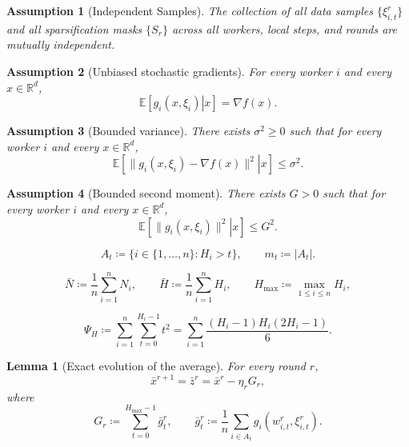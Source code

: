 \documentclass[10pt,a4paper]{amsart}
\newtheorem{assumption}{Assumption}
\newtheorem{lemma}{Lemma}
\newcommand{\ExpCond}[2]{{\mathbb{E}}\left[\left.#1\right\vert#2\right]}
\newcommand{\R}{\mathbb{R}}  %
\newcommand{\eqdef}{\coloneqq}
\begin{document}
\begin{assumption}[Independent Samples]\label{ass:independence}
    The collection of all data samples $\{\xi_{i,t}^r\}$ and all sparsification masks $\{S_r\}$ across all workers, local steps, and rounds are mutually independent.
\end{assumption}

\begin{assumption}[Unbiased stochastic gradients]\label{ass:unbiased}
    For every worker $i$ and every $x \in \R^d$,
    \[%
        \ExpCond{g_i(x,\xi_i)}{x} = \nabla f(x).
    \]
\end{assumption}

\begin{assumption}[Bounded variance]\label{ass:bounded_variance}
    There exists $\sigma^2 \ge 0$ such that for every worker $i$ and every $x \in \R^d$,
    \[%
        \ExpCond{\|g_i(x,\xi_i)-\nabla f(x) \|^2}{x} \leq \sigma^2.
    \]
\end{assumption}

\begin{assumption}[Bounded second moment]\label{ass:bounded_second_moment}
    There exists $G>0$ such that for every worker $i$ and every $x \in \R^d$,
    \[%
        \ExpCond{ \|g_i(x,\xi_i)\|^2 }{ x } \leq G^2.
    \]
\end{assumption}

\begin{equation}\label{eq:A_t-89yf908df}%
    A_t \eqdef \{i\in\{1,\dots,n\}: H_i>t\},
    \qquad
    m_t \eqdef |A_t|.
\end{equation}

\begin{equation}\label{eq:-0-0-098uy8ygugf}%
    \bar N \eqdef \frac{1}{n}\sum_{i=1}^n N_i,
    \qquad
    \bar H \eqdef \frac{1}{n}\sum_{i=1}^n H_i,
    \qquad
    H_{\max} \eqdef \max_{1\leq i\leq n} H_i,
\end{equation}

\begin{equation}\label{eq:Psi_H-defn}%
    \Psi_H
    \eqdef
    \sum_{i=1}^n\sum_{t=0}^{H_i-1} t^2
    =
    \sum_{i=1}^n \frac{(H_i-1)H_i(2H_i-1)}{6}.
\end{equation}

\begin{lemma}[Exact evolution of the average]
\label{lem:avg_evol_09vdf}For every round \(r\),
\begin{equation}\label{eq:no8yfd9y89fd08ygf}
\bar x^{r+1}=\bar z^r = \bar x^r-\eta_r G_r,
\end{equation}
where
\begin{equation}\label{eq:oi-f9ud0fdg}
G_r \eqdef \sum_{t=0}^{H_{\max}-1} \bar g_t^r,
\qquad
\bar g_t^r \eqdef \frac{1}{n}\sum_{i\in A_t} g_i(w_{i,t}^r,\xi_{i,t}^r).
\end{equation}
\end{lemma}
\end{document}
